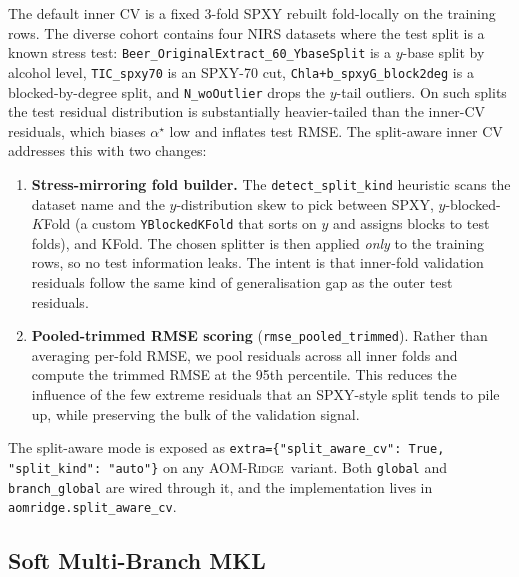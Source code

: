 \documentclass[11pt,a4paper]{article}
\newcommand{\AOMR}{\textsc{AOM-Ridge}\xspace}
\begin{document}
The default inner CV is a fixed 3-fold SPXY rebuilt fold-locally on
the training rows. The diverse cohort contains four NIRS datasets
where the test split is a known stress test:
\texttt{Beer\_OriginalExtract\_60\_YbaseSplit} is a $y$-base split by
alcohol level, \texttt{TIC\_spxy70} is an SPXY-70 cut,
\texttt{Chla{+}b\_spxyG\_block2deg} is a blocked-by-degree split, and
\texttt{N\_woOutlier} drops the $y$-tail outliers. On such splits the
test residual distribution is substantially heavier-tailed than the
inner-CV residuals, which biases $\alpha^\star$ low and inflates test
RMSE. The split-aware inner CV addresses this with two changes:
\begin{enumerate}[leftmargin=2em,itemsep=0pt]
  \item \textbf{Stress-mirroring fold builder.} The
        \texttt{detect\_split\_kind} heuristic scans the dataset name
        and the $y$-distribution skew to pick between SPXY,
        $y$-blocked-$K$Fold (a custom \texttt{YBlockedKFold} that
        sorts on $y$ and assigns blocks to test folds), and KFold.
        The chosen splitter is then applied \emph{only} to the
        training rows, so no test information leaks. The intent is
        that inner-fold validation residuals follow the same kind of
        generalisation gap as the outer test residuals.
  \item \textbf{Pooled-trimmed RMSE scoring}
        (\texttt{rmse\_pooled\_trimmed}). Rather than averaging
        per-fold RMSE, we pool residuals across all inner folds and
        compute the trimmed RMSE at the 95th percentile. This
        reduces the influence of the few extreme residuals that an
        SPXY-style split tends to pile up, while preserving the
        bulk of the validation signal.
\end{enumerate}
The split-aware mode is exposed as
\texttt{extra=\{"split\_aware\_cv": True, "split\_kind": "auto"\}} on
any \AOMR\ variant. Both \texttt{global} and \texttt{branch\_global}
are wired through it, and the implementation lives in
\texttt{aomridge.split\_aware\_cv}.

\subsection{Soft Multi-Branch MKL}\label{sec:method-mbmkl}
\end{document}
